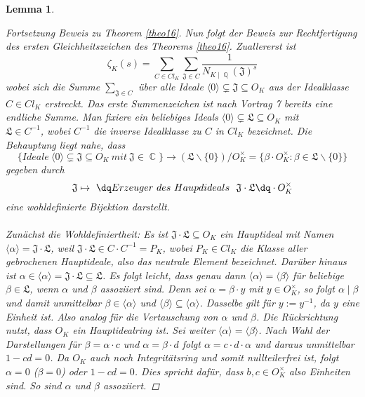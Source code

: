 \documentclass[10pt,a4paper]{article}
\theoremstyle{plain}
\newtheorem{lem}[thm]{Lemma}
\theoremstyle{definition}
\theoremstyle{remark}
\DeclareMathOperator{\C}{\mathbb{C}}
\DeclareMathOperator{\Q}{\mathbb{Q}}
\begin{document}
\begin{lem}
\begin{proof}[Fortsetzung Beweis zu Theorem \ref{theo16}]
Nun folgt der Beweis zur Rechtfertigung des ersten Gleichheitszeichen des Theorems \ref{theo16}. Zuallererst ist $$\zeta_K(s) = \sum_{C \in Cl_K}\sum_{\mathfrak{J} \in C}\frac{1}{N_{K\mid \Q}(\mathfrak{J})^s}$$wobei sich die Summe $\sum_{\mathfrak{J} \in C}$ über alle Ideale $\langle 0 \rangle \subsetneq \mathfrak{J} \subseteq O_K$ aus der Idealklasse $C \in Cl_K$ erstreckt. Das erste Summenzeichen ist nach Vortrag 7 bereits eine endliche Summe. Man fixiere ein beliebiges Ideals $\langle 0 \rangle \subsetneq \mathfrak{L} \subseteq O_K$ mit \\$\mathfrak{L}\in C^{-1}$, wobei $C^{-1}$ die inverse Idealklasse zu $C$ in $Cl_K$ bezeichnet. Die Behauptung liegt nahe, dass  $$\{Ideale \ \langle 0 \rangle \subsetneq \mathfrak{J} \subseteq O_K \ mit \ \mathfrak{J} \in \C\}\rightarrow(\mathfrak{L}\backslash\{0\})/O_K^{\times}=\{ \beta \cdot O_K^{\times} \colon \beta \in \mathfrak{L}\backslash\{ 0\}\}$$ gegeben durch $$\mathfrak{J}\mapsto \ \dq Erzeuger\ des\ Haupdideals \ \ \mathfrak{J\cdot L} \dq \cdot O_K^{\times}$$ eine wohldefinierte Bijektion darstellt. \\
\\
Zunächst die Wohldefiniertheit:
Es ist $\mathfrak{J\cdot L}\subseteq O_K$ ein Hauptideal mit Namen $\langle \alpha \rangle=\mathfrak{J\cdot L}$, weil $\mathfrak{J\cdot L} \in C\cdot C^{-1} = P_K$, wobei $P_K \in Cl_K$ die Klasse aller gebrochenen Hauptideale, also das neutrale Element bezeichnet. Darüber hinaus ist $\alpha \in \langle \alpha \rangle=\mathfrak{J\cdot L}\subseteq \mathfrak{L}$. Es folgt leicht, dass genau dann $\langle \alpha \rangle=\langle \beta \rangle$ für beliebige $\beta \in \mathfrak{L}$, wenn $\alpha$ und $\beta$ assoziiert sind. Denn sei $\alpha=\beta \cdot y$ mit $y \in O_K^{\times}$, so folgt $\alpha \mid \beta$ und damit unmittelbar $\beta \in \langle \alpha \rangle$ und $\langle \beta \rangle  \subseteq \langle \alpha \rangle$. Dasselbe gilt für $y:= y^{-1}$, da $y$ eine Einheit ist. Also analog für die Vertauschung von $\alpha$ und $\beta$. Die Rückrichtung nutzt, dass $O_K$ ein Hauptidealring ist. Sei weiter $\langle \alpha \rangle=\langle \beta \rangle$. Nach Wahl der Darstellungen für $\beta=\alpha\cdot c$ und $\alpha=\beta\cdot d$ folgt $\alpha=c\cdot d \cdot \alpha$ und daraus unmittelbar $1-cd=0$. Da $O_K$ auch noch Integritätsring und somit nullteilerfrei ist, folgt $\alpha=0$  ($\beta =0$) oder $1-cd=0$. Dies spricht dafür, dass $b,c \in O_K^{\times}$ also Einheiten sind. So sind $\alpha$ und $\beta$ assoziiert.

\end{proof}
\end{lem}
\end{document}
